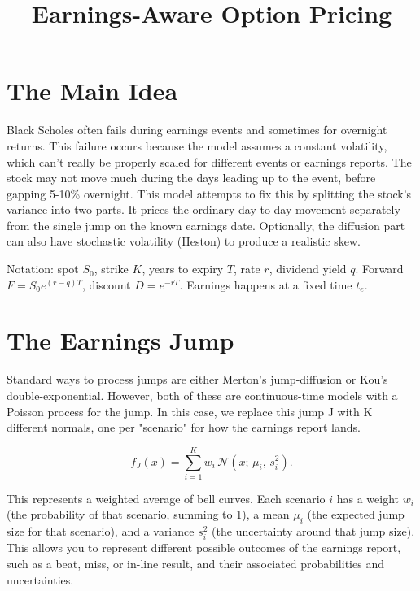 \documentclass[11pt]{article}
\title{Earnings-Aware Option Pricing}
\author{}\date{}
\begin{document}
\maketitle
\vspace{-3.2em}

\section{The Main Idea}

Black Scholes often fails during earnings events and sometimes for overnight returns. 
This failure occurs because the model assumes a constant volatility, which can't really be
properly scaled for different events or earnings reports. The stock may not move much 
during the days leading up to the event, before gapping 5-10\% overnight. This model 
attempts to fix this by splitting the stock's variance into two parts. It prices the 
ordinary day-to-day movement separately from the single jump on the known earnings date.
Optionally, the diffusion part can also have stochastic volatility (Heston) to produce a realistic skew.

Notation: spot $S_0$, strike $K$, years to expiry $T$, rate $r$, dividend yield
$q$. Forward $F=S_0e^{(r-q)T}$, discount $D=e^{-rT}$. Earnings happens at a fixed
time $t_e$.

\section{The Earnings Jump}

Standard ways to process jumps are either Merton's jump-diffusion or Kou's double-exponential.
However, both of these are continuous-time models with a Poisson process for the jump. 
In this case, we replace this jump J with K different normals, one per "scenario" for how the earnings report lands.

\begin{equation}
f_J(x) = \sum_{i=1}^{K} w_i\,\mathcal N(x;\,\mu_i,\,s_i^2).
\end{equation}

This represents a weighted average of bell curves. Each scenario $i$ has a weight $w_i$ (the probability of that scenario, summing to 1), a mean $\mu_i$ (the expected jump size for that scenario), and a variance $s_i^2$ (the uncertainty around that jump size).
This allows you to represent different possible outcomes of the earnings report, such as a beat, miss, or in-line result, and their associated probabilities and uncertainties.
\end{document}
